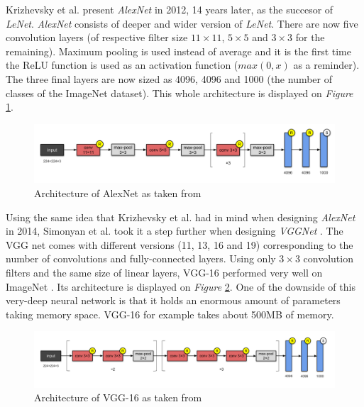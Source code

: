 Krizhevsky et al. present \emph{AlexNet} \cite{Krizhevsky2012} in 2012, 14 years later, as the succesor of \emph{LeNet}. \emph{AlexNet} consists of deeper and wider version of \emph{LeNet}. There are now five convolution layers (of respective filter size $11 \times 11$, $5 \times 5$ and $3 \times 3$ for the remaining). Maximum pooling is used instead of average and it is the first time the ReLU function is used as an activation function ($max(0,x)$ as a reminder). The three final layers are now sized as 4096, 4096 and 1000 (the number of classes of the ImageNet \cite{ImageNet2009} dataset). This whole architecture is displayed on \emph{Figure} \ref{fig:AlexNet}.

\begin{figure}[htbp]
	\centering
		\includegraphics[width=12cm]{Figures/AlexNet.png}
	\caption[AlexNet]{Architecture of AlexNet as taken from \cite{Krizhevsky2012}}
	\label{fig:AlexNet}
\end{figure}


Using the same idea that Krizhevsky et al. \cite{Krizhevsky2012} had in mind when designing \emph{AlexNet} in 2014, Simonyan et al. took it a step further when designing \emph{VGGNet} \cite{Simonyan2014}. The VGG net comes with different versions (11, 13, 16 and 19) corresponding to the number of convolutions and fully-connected layers. Using only $3 \times 3$ convolution filters and the same size of linear layers, VGG-16 performed very well on ImageNet \cite{ImageNet2009}. Its architecture is displayed on \emph{Figure} \ref{fig:VGG-16}. One of the downside of this very-deep neural network is that it holds an enormous amount of parameters taking memory space. VGG-16 for example takes about 500MB of memory.

\begin{figure}[htbp]
	\centering
		\includegraphics[width=14cm]{Figures/VGG-16.png}
	\caption[VGG-16]{Architecture of VGG-16 as taken from \cite{Simonyan2014}}
	\label{fig:VGG-16}
\end{figure}

